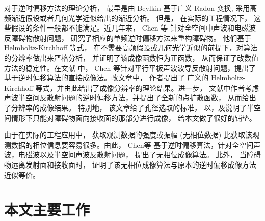 对于逆时偏移方法的理论分析， 最早是由 Beylkin \cite{beylkin1984inversion,beylkin1985imaging,beylkin1990linearized} 基于广义 Radon 变换, 采用高
频渐近假设或者几何光学近似给出的渐近分析。 但是， 在实际的工程情况下， 这些假设的条件一般都不能满足。近几年来， Chen 等\cite{chen2013reverse_acou,chen2013reverse_elec} 针对全空间中声波和电磁波反障碍物散射问题， 研究了相应的单频逆时偏移方法来重构障碍物。 他们基于  Helmholtz-Kirchhoff 等式， 在不需要高频假设或几何光学近似的前提下，对算法的分辨率做出来严格分析， 并证明了该成像函数恒为正函数， 从而保证了改数值方法的稳定性。在文献 \cite{chen2015reverse_planar} 中， Chen 等针对平行平板声波波导反散射问题，提出了基于逆时偏移算法的直接成像法。改文章中， 作者提出了 广义的 Helmholtz-Kirchhoff 等式，并由此给出了成像分辨率的理论结果。进一步， 文献\cite{RTMhalf_aco}中作者考虑声波半空间反散射问题的逆时偏移方法，并提出了全新的点扩散函数， 从而给出了分辨率的成像结果。 特别地， 该文章给了孔径选取的标准， 以，及说明了半空间情形下只能对障碍物面向接收面的那部分进行成像， 给本文做了很好的铺垫。

由于在实际的工程应用中， 获取观测数据的强度或振幅 (无相位数据) 比获取该观测数据的相位信息要容易很多。由此， Chen等 \cite{chen2017phaseless,chen2016direct,chen2017direct} 基于逆时偏移算法，针对全空间声波，电磁波以及半空间声波反散射问题， 提出了无相位成像算法。 此外， 当障碍物远离发射面和接收面时， 证明了该无相位成像算法与原本的逆时偏移成像方法近似等价。




\section{本文主要工作}
